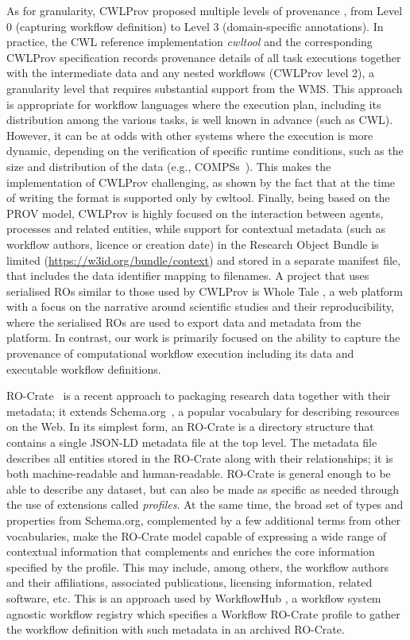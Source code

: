 \documentclass[10pt,letterpaper]{article}
\begin{document}
As for granularity, CWLProv proposed multiple levels of provenance \cite[figure 2]{Khan 2019}, from Level 0 (capturing workflow definition) to Level 3 (domain-specific annotations). 
In practice, the CWL reference implementation \emph{cwltool} \cite{Amstutz 2023} and the corresponding CWLProv specification \cite{Soiland-Reyes 2018} records provenance details of all task executions together with the intermediate data and any nested workflows (CWLProv level 2), a granularity level that requires substantial support from the WMS.
This approach is appropriate for workflow languages where the execution plan, including its distribution among the various tasks, is well known in advance (such as CWL).
However, it can be at odds with other systems where the execution is more dynamic, depending on the verification of specific runtime conditions, such as the size and distribution of the data (e.g., COMPSs~\cite{Lordan 2014}).
This makes the implementation of CWLProv challenging, as shown by the fact that at the time of writing the format is supported only by cwltool.
Finally, being based on the PROV model, CWLProv is highly focused on the interaction between agents, processes and related entities, while support for contextual metadata (such as workflow authors, licence or creation date) in the Research Object Bundle is limited (\url{https://w3id.org/bundle/context}) and stored in a separate manifest file, that includes the data identifier mapping to filenames.
A project that uses serialised ROs similar to those used by CWLProv is Whole Tale \cite{Chard 2019}, a web platform with a focus on the narrative around scientific studies and their reproducibility, where the serialised ROs are used to export data and metadata from the platform. In contrast, our work is primarily focused on the ability to capture the provenance of computational workflow execution including its data and executable workflow definitions.

RO-Crate~\cite{Soiland-Reyes 2022a} is a recent approach to packaging research data together with their metadata; it extends Schema.org~\cite{Guha 2015}, a popular vocabulary for describing resources on the Web.
In its simplest form, an RO-Crate is a directory structure that contains a single JSON-LD \cite{w3-json-ld} metadata file at the top level.
The metadata file describes all entities stored in the RO-Crate along with their relationships; it is both machine-readable and human-readable.
RO-Crate is general enough to be able to describe any dataset, but can also be made as specific as needed through the use of extensions called
\emph{profiles}.
At the same time, the broad set of types and properties from Schema.org, complemented by a few additional terms from other vocabularies, make the RO-Crate model capable of expressing a wide range of contextual information that complements and enriches the core information specified by the profile.
This may include, among others, the workflow authors and their affiliations, associated publications, licensing information, related software, etc.
This is an approach used by WorkflowHub \cite{Goble 2021}, a workflow system agnostic workflow registry which specifies a Workflow RO-Crate profile \cite{Bacall 2022} to gather the workflow definition with such metadata in an archived RO-Crate. 
\end{document}
